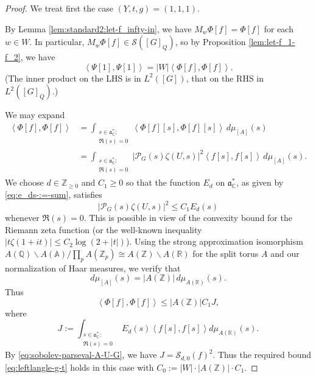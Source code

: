 \begin{proof}
  We treat first the case $(Y,t,g) = (1,1,1)$.

  By Lemma \ref{lem:standard2:let-f_infty-in}, we have $M_w \Phi[f] = \Phi[f]$ for each $w \in W$.  In particular, $M_w \Phi[f] \in \mathcal{S}([G]_Q)$, so by Proposition \ref{lem:let-f_1-f_2}, we have
  \begin{equation*}
    \left\langle \Psi[1], \Psi[1]  \right\rangle
    = |W| \left\langle \Phi[f], \Phi[f] \right\rangle.
  \end{equation*}
  (The inner product on the LHS is in $L^2([G])$, that on the RHS in $L^2([G]_Q)$.)

  We may expand
  \begin{align*}
    \left\langle \Phi[f], \Phi[f] \right\rangle
    &=
      \int_{
      \substack{
      s \in \mathfrak{a}_{\mathbb{C}}^* :  \\
    \Re(s) = 0
    }
    }
    \left\langle \Phi[f][s], \Phi[f][s] \right\rangle \, d \mu_{[A]}(s) \\
    &=
      \int_{
      \substack{
      s \in \mathfrak{a}_{\mathbb{C}}^* :  \\
    \Re(s) = 0
    }
    }
    |\mathcal{P}_G(s) \zeta(U,s)|^2
    \left\langle f[s], f[s] \right\rangle \, d \mu_{[A]}(s).
  \end{align*}
  We choose $d \in \mathbb{Z}_{\geq 0}$ and $C_1 \geq 0$ so that the function $E_d$ on $\mathfrak{a}_{\mathbb{C}}^*$, as given by \eqref{eq:e_ds-:=-sum}, satisfies
  \begin{equation*}
    |\mathcal{P}_G(s) \zeta(U,s)|^2 \leq C_1 E_d(s)
  \end{equation*}
  whenever $\Re(s) = 0$.  This is possible in view of the convexity bound for the Riemann zeta function (or the well-known inequality $|t \zeta(1+it)| \leq C_2 \log(2 + |t|)$).  Using the strong approximation isomorphism $A(\mathbb{Q}) \backslash A(\mathbb{A}) / \prod_p A(\mathbb{Z}_p) \cong  A(\mathbb{Z})  \backslash A(\mathbb{R})$ for the split torus $A$ and our normalization of Haar measures, we verify that
  \begin{equation*}
    d \mu_{[A]}(s) = |A(\mathbb{Z})|\,  d \mu_{A(\mathbb{R})}(s).
  \end{equation*}
  Thus
  \begin{equation*}
    \left\langle \Phi[f], \Phi[f] \right\rangle \leq |A(\mathbb{Z})| C_1 J,
  \end{equation*}
  where
  \begin{equation*}
    J := \int_{
      \substack{
        s \in \mathfrak{a}_\mathbb{C}^* :  \\
        \Re(s)  = 0
      }
    }
    E_d(s) \left\langle f[s], f[s] \right\rangle d \mu_{A(\mathbb{R})}(s).
  \end{equation*}
  By \eqref{eq:sobolev-parseval-A-U-G}, we have $J = \mathcal{S}_{d,0}(f)^2$.  Thus the required bound \eqref{eq:leftlangle-g-t} holds in this case with $C_0 := |W| \cdot |A(\mathbb{Z})| \cdot  C_1$.


\end{proof}
